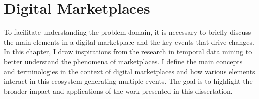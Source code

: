 \chapter{Digital Marketplaces}
\label{ch:conceptual_framework_chapter}
To facilitate understanding the problem domain, it is necessary to briefly discuss the main elements in a digital marketplace and the key events that drive changes.
In this chapter, I draw inspirations from the research in temporal data mining \cite{adar2009temporal, aggarwal2015data} to better understand the phenomena of marketplaces.
I define the main concepts and terminologies in the context of digital marketplaces and how various elements interact in this ecosystem generating multiple events.
The goal is to highlight the broader impact and applications of the work presented in this dissertation.

